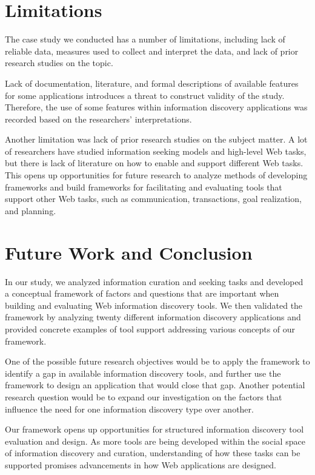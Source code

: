 \documentclass{casconpaper}
\begin{document}
{\section{Limitations}
The case study we conducted has a number of limitations, including lack of reliable data, measures used to collect and interpret the data, and lack of prior research studies on the topic. 

Lack of documentation, literature, and formal descriptions of available features for some applications introduces a threat to construct validity of the study. Therefore, the use of some features within information discovery applications was recorded based on the researchers' interpretations. 

Another limitation was lack of prior research studies on the subject matter. A lot of researchers have studied information seeking models and high-level Web tasks, but there is lack of literature on how to enable and support different Web tasks. This opens up opportunities for future research to analyze methods of developing frameworks and build frameworks for facilitating and evaluating tools that support other Web tasks, such as communication, transactions, goal realization, and planning.

} %

{\section{ Future Work and Conclusion }
In our study, we analyzed information curation and seeking tasks and developed a conceptual framework of factors and questions that are important when building and evaluating Web information discovery tools. We then validated the framework by analyzing twenty different information discovery applications and provided concrete examples of tool support addressing various concepts of our framework.

One of the possible future research objectives would be to apply the framework to identify a gap in available information discovery tools, and further use the framework to design an application that would close that gap. Another potential research question would be to expand our investigation on the factors that influence the need for one information discovery type over another. 

Our framework opens up opportunities for structured information discovery tool evaluation and design. As more tools are being developed within the social space of information discovery and curation, understanding of how these tasks can be supported promises advancements in how Web applications are designed.

} %
\end{document}

